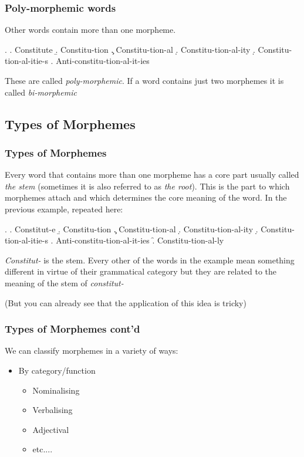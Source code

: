 \begin{frame}
\frametitle{Poly-morphemic words}
Other words contain more than one morpheme.  

\ex.
\a. Constitute
\b. Constitu-tion
\c. Constitu-tion-al
\d. Constitu-tion-al-ity
\d. Constitu-tion-al-itie-s
\e. Anti-constitu-tion-al-it-ies


These are called \textit{poly-morphemic}.  If a word contains just two morphemes it is called \textit{bi-morphemic}

\end{frame}

\subsection{Types of Morphemes}
\begin{frame}
  \frametitle{Types of Morphemes}

Every word that contains more than one morpheme has a core part usually called \textit{the stem} (sometimes it is also referred to as \textit{the root}).  This is the part to which morphemes attach and which determines the core meaning of the word.  In the previous example, repeated here:

\ex.
\a. Constitut-e
\b. Constitu-tion
\c. Constitu-tion-al
\d. Constitu-tion-al-ity
\d. Constitu-tion-al-itie-s
\e. Anti-constitu-tion-al-it-ies
\f. Constitu-tion-al-ly

\textit{Constitut-} is the stem.  Every other of the words in the example mean something different in virtue of their grammatical category but they are related to the meaning of the stem of \textit{constitut-}

(But you can already see that the application of this idea is tricky)

\end{frame}

\begin{frame}
\frametitle{Types of Morphemes cont'd}

We can classify morphemes in a variety of ways:

\begin{itemize}
\item By category/function
  \begin{itemize}
  \item Nominalising
  \item Verbalising
  \item Adjectival
  \item etc....
  \end{itemize}

\end{itemize}
\end{frame}


